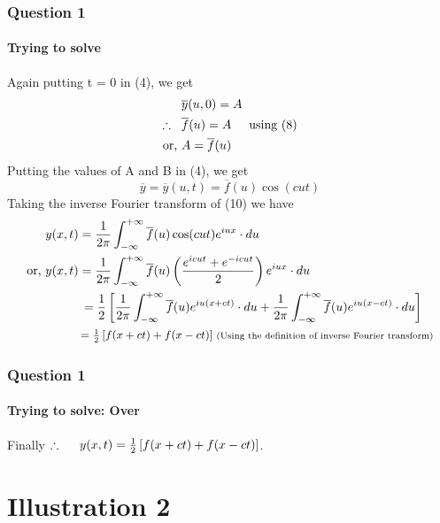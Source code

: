 \documentclass[9 pt]{beamer}
\begin{document}
\begin{frame}[fragile]
\frametitle{Question 1}
\framesubtitle{Trying to solve}
Again putting t = 0 in (4), we get
\begin{align*}
&\overline{y}(u,0)=A \\
\therefore \hspace{0.3cm}&\overline{f}(u)=A \hspace{0.5cm} \textrm{using (8)} \\
\textrm{or, }&A=\overline{f}(u)
\end{align*}
Putting the values of A and B in (4), we get
\begin{equation}
\overline{y}=\overline{y}(u,t)=\overline{f}(u)\cos (cut)
\end{equation}
Taking the inverse Fourier transform of (10) we have
\begin{align*}
&y(x,t)=\frac{1}{2\pi}\int_{-\infty}^{+\infty}\overline{f}(u)\cos (cut)e^{iux}\cdot du \\
\textrm{or, }&y(x,t)=\frac{1}{2\pi}\int_{-\infty}^{+\infty}\overline{f}(u)\left(\frac{e^{icut}+e^{-icut}}{2}\right) e^{iux}\cdot du \\
&\hspace{1cm}=\frac{1}{2}\left[\frac{1}{2\pi}\int_{-\infty}^{+\infty}\overline{f}(u)e^{iu(x+ct)}\cdot du + \frac{1}{2\pi}\int_{-\infty}^{+\infty}\overline{f}(u)e^{iu(x-ct)}\cdot du\right] \\
&\hspace{1cm}\mbox{\small $=\frac{1}{2}\left[f(x+ct)+f(x-ct)\right]$}\hspace{0.1cm} \textrm{\scriptsize{(Using the definition of inverse Fourier transform)}}
\end{align*}

\transfade[duration=0.6]
\end{frame}

\begin{frame}[fragile]
\frametitle{Question 1}
\framesubtitle{Trying to solve: Over}
\begin{block}{Finally}
$\therefore\hspace{0.5cm}y(x,t)=\frac{1}{2}\left[f(x+ct)+f(x-ct)\right]$.
\end{block}

\transwipe[duration=0.6]
\end{frame}

\section{Illustration 2}
\end{document}
